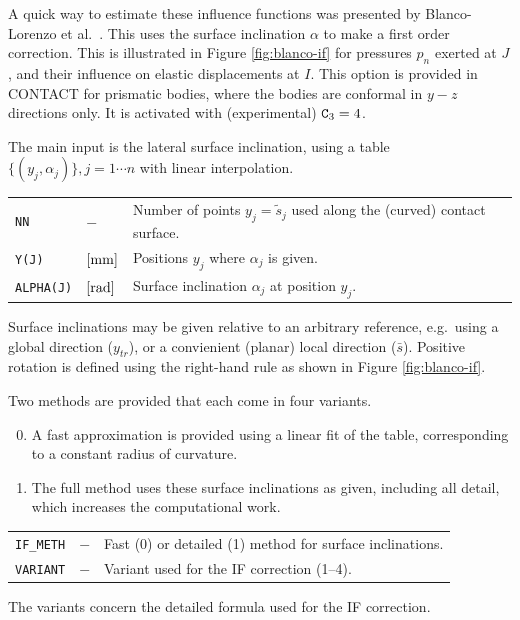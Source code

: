 \documentclass[12pt]{report}
\renewcommand{\magenta}[1]{}
\newenvironment{inputvars}{\vspace{0.4\baselineskip}%

\begin{tabular}{>{\raggedright}p{22mm}p{19mm}p{113mm}}}{
\end{tabular}

}
\newcommand{\inpvar}[3]{{\small\tt #1} & $#2$ & #3 \\[1ex]}
\begin{document}
A quick way to estimate these influence functions was presented by
Blanco-Lorenzo et al.\ \cite{BlancoLorenzo2016,BlancoLorenzo2021a-inflcoef}.
This uses the surface inclination $\alpha$ to make a first order correction.
This is illustrated in Figure \ref{fig:blanco-if} for pressures $p_n$ exerted
at $J$, and their influence on elastic displacements at $I$.  This option is
provided in CONTACT for prismatic bodies, where the bodies are conformal in
$y-z$ directions only. It is activated with (experimental) ${\tt C}_3=4$.

The main input is the lateral surface inclination, using a table
$\{ (y_j, \alpha_j) \}, j=1\cdots n$ with linear interpolation.
\begin{inputvars}
\inpvar{NN}{-}{Number of points $y_j=\tilde{s}_j$ used along the (curved)
        contact surface.}
\inpvar{Y(J)}{\bunit{mm}}{Positions $y_j$ where $\alpha_j$ is given.}
\inpvar{ALPHA(J)}{\bunit{rad}}{Surface inclination $\alpha_j$ at position $y_j$.}
\end{inputvars}
Surface inclinations may be given relative to an arbitrary reference, e.g.\
using a global direction ($y_{tr}$), or a convienient (planar) local
direction ($\bar{s}$). Positive rotation is defined using the right-hand
rule as shown in Figure \ref{fig:blanco-if}.

Two methods are provided that each come in four variants. 
\begin{enumerate}\setcounter{enumi}{-1}
\item A fast approximation is provided using a linear fit of the table,
        corresponding to a constant radius of curvature.
\item The full method uses these surface inclinations as given,
        including all detail, which increases the computational work.
\end{enumerate}
\begin{inputvars}
\inpvar{IF\_METH}{-}{Fast (0) or detailed (1) method for surface
        inclinations.}
\inpvar{VARIANT}{-}{Variant used for the IF correction (1--4).}
\end{inputvars}
The variants concern the detailed formula used for the IF correction.
\magenta{
\begin{enumerate}
\item Blanco-proposal, decomposing pressures $\vec{p}$;
\item same, without $B_{xn}$ correction;
\item Vollebregt-proposal, transforming displacements $\vec{u}$;
\item Combined proposal, using $\vec{p}$ and $\vec{u}$.
\end{enumerate}
}
\end{document}
